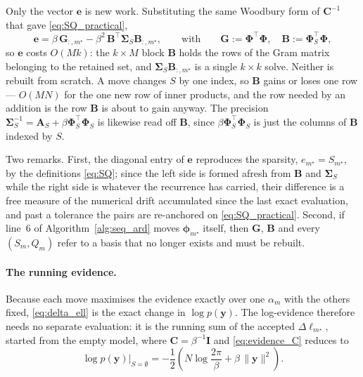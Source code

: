 \documentclass[a4paper]{article}
\renewcommand{\vec}[1]{\boldsymbol{#1}}
\begin{document}
Only the vector $\vec e$ is new work. Substituting the same Woodbury form of $\mathbf C^{-1}$ that gave \eqref{eq:SQ_practical},
\begin{equation} \label{eq:e_practical}
    \vec e = \beta \, \mathbf G_{:,m^\star} - \beta^2 \, \mathbf B^\top \mathbf \Sigma_S \mathbf B_{:,m^\star},
    \qquad \text{with} \qquad
    \mathbf G := \mathbf \Phi^\top \mathbf \Phi, \quad \mathbf B := \mathbf \Phi_S^\top \mathbf \Phi,
\end{equation}
so $\vec e$ costs $O(Mk)$: the $k \times M$ block $\mathbf B$ holds the rows of the Gram matrix belonging to the retained set, and $\mathbf \Sigma_S \mathbf B_{:,m^\star}$ is a single $k \times k$ solve. Neither is rebuilt from scratch. A move changes $S$ by one index, so $\mathbf B$ gains or loses one row --- $O(MN)$ for the one new row of inner products, and the row needed by an addition is the row $\mathbf B$ is about to gain anyway. The precision $\mathbf \Sigma_S^{-1} = \mathbf A_S + \beta \mathbf \Phi_S^\top \mathbf \Phi_S$ is likewise read off $\mathbf B$, since $\beta \mathbf \Phi_S^\top \mathbf \Phi_S$ is just the columns of $\mathbf B$ indexed by $S$.

Two remarks. First, the diagonal entry of $\vec e$ reproduces the sparsity, $e_{m^\star} = S_{m^\star}$, by the definitions \eqref{eq:SQ}; since the left side is formed afresh from $\mathbf B$ and $\mathbf \Sigma_S$ while the right side is whatever the recurrence has carried, their difference is a free measure of the numerical drift accumulated since the last exact evaluation, and past a tolerance the pairs are re-anchored on \eqref{eq:SQ_practical}. Second, if line~6 of Algorithm~\ref{alg:seq_ard} moves $\vec \phi_{m^\star}$ itself, then $\mathbf G$, $\mathbf B$ and every $(S_m, Q_m)$ refer to a basis that no longer exists and must be rebuilt.

\paragraph{The running evidence.} Because each move maximises the evidence exactly over one $\alpha_m$ with the others fixed, \eqref{eq:delta_ell} is the exact change in $\log p(\mathbf y)$. The log-evidence therefore needs no separate evaluation: it is the running sum of the accepted $\Delta \ell_{m^\star}$, started from the empty model, where $\mathbf C = \beta^{-1} \mathbf I$ and \eqref{eq:evidence_C} reduces to
\begin{equation} \label{eq:evidence_empty}
    \log p(\mathbf y) \big|_{S = \emptyset} = - \frac{1}{2} \left( N \log \frac{2 \pi}{\beta} + \beta \, \|\mathbf y\|^2 \right).
\end{equation}
\end{document}
